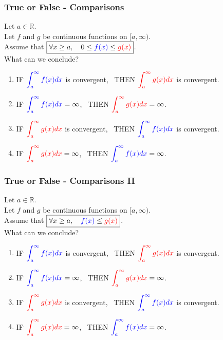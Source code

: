 \documentclass[14pt]{beamer}
\newcommand {\DS} [1] {${\displaystyle #1}$}
\newcommand {\R}{\mathbb{R}}
\newcommand{\azul}[1]{{\color{blue} #1}}
\newcommand{\rojo}[1]{{\color{red} #1}}
\newcommand{\setsize}[1]{\fontsize{#1}{#1}\selectfont} %
\begin{document}
\begin{frame}[t]
\setsize{11}
\frametitle{True or False - Comparisons}

Let $a \in \R$. \\
Let $f$ and $g$ be continuous functions on $[a, \infty)$. \\
Assume that \DS{\boxed{\forall x \geq a, \quad 0 \leq  \azul{f(x)} \leq \rojo{g(x)}}}. \\
What can we conclude?

\begin{enumerate}
	\item  IF \DS{\azul{\int_a^{\infty} f(x) dx}} is convergent, \, THEN \DS{\rojo{\int_a^{\infty} g(x) dx}} is convergent.
	\item  IF \DS{\azul{\int_a^{\infty} f(x) dx} = \infty}, \, THEN \DS{\rojo{\int_a^{\infty} g(x) dx} = \infty}.
	\item  IF \DS{\rojo{\int_a^{\infty} g(x) dx}} is convergent, \, THEN \DS{\azul{\int_a^{\infty} f(x) dx}} is convergent.
	\item  IF \DS{\rojo{\int_a^{\infty} g(x) dx} = \infty}, \, THEN \DS{\azul{\int_a^{\infty} f(x) dx} = \infty}.
\end{enumerate}

\end{frame}
\begin{frame}[t]
\setsize{11}
\frametitle{True or False - Comparisons II}

Let $a \in \R$. \\
Let $f$ and $g$ be continuous functions on $[a, \infty)$. \\
Assume that \DS{\boxed{\forall x \geq a, \quad \azul{f(x)} \leq \rojo{g(x)}}}. \\
What can we conclude?

\begin{enumerate}
	\item  IF \DS{\azul{\int_a^{\infty} f(x) dx}} is convergent, \, THEN \DS{\rojo{\int_a^{\infty} g(x) dx}} is convergent.
	\item  IF \DS{\azul{\int_a^{\infty} f(x) dx} = \infty}, \, THEN \DS{\rojo{\int_a^{\infty} g(x) dx} = \infty}.
	\item  IF \DS{\rojo{\int_a^{\infty} g(x) dx}} is convergent, \, THEN \DS{\azul{\int_a^{\infty} f(x) dx}} is convergent.
	\item  IF \DS{\rojo{\int_a^{\infty} g(x) dx} = \infty}, \, THEN \DS{\azul{\int_a^{\infty} f(x) dx} = \infty}.
\end{enumerate}

\end{frame}
\end{document}
